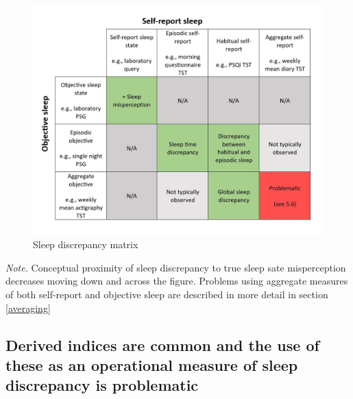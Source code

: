 \documentclass[
]{article}
\begin{document}
\begin{figure}
\centering
\includegraphics{../matrix.jpg}
\caption{\label{fig:subtypes}Sleep discrepancy matrix}
\end{figure}

\emph{Note.} Conceptual proximity of sleep discrepancy to true sleep sate misperception decreases moving down and across the figure. Problems using aggregate measures of both self-report and objective sleep are described in more detail in section \ref{averaging}

\subsection{Derived indices are common and the use of these as an operational measure of sleep discrepancy is problematic}\label{dvar}
\end{document}
